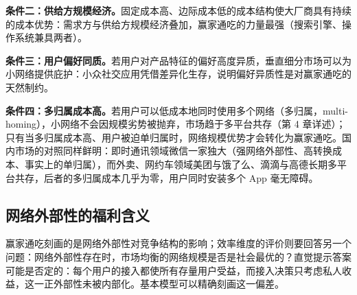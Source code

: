 \textbf{条件二：供给方规模经济。}固定成本高、边际成本低的成本结构使大厂商具有持续的成本优势：需求方与供给方规模经济叠加，赢家通吃的力量最强（搜索引擎、操作系统兼具两者）。

\textbf{条件三：用户偏好同质。}若用户对产品特征的偏好高度异质，垂直细分市场可以为小网络提供庇护：小众社交应用凭借差异化生存，说明偏好异质性是对赢家通吃的天然制约。

\textbf{条件四：多归属成本高。}若用户可以低成本地同时使用多个网络（多归属，multi-homing），小网络不会因规模劣势被抛弃，市场趋于多平台共存（第 4 章详述）；只有当多归属成本高、用户被迫单归属时，网络规模优势才会转化为赢家通吃。国内市场的对照同样鲜明：即时通讯领域微信一家独大（强网络外部性、高转换成本、事实上的单归属），而外卖、网约车领域美团与饿了么、滴滴与高德长期多平台共存，后者的多归属成本几乎为零，用户同时安装多个 App 毫无障碍。

\subsection{网络外部性的福利含义}

赢家通吃刻画的是网络外部性对竞争结构的影响；效率维度的评价则要回答另一个问题：网络外部性存在时，市场均衡的网络规模是否是社会最优的？直觉提示答案可能是否定的：每个用户的接入都使所有存量用户受益，而接入决策只考虑私人收益，这一正外部性未被内部化。基本模型可以精确刻画这一偏差。

